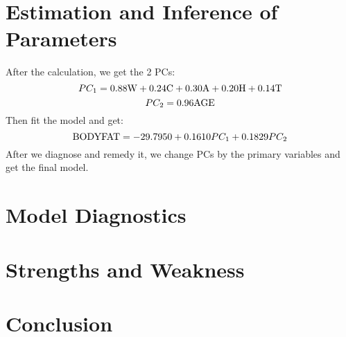 \documentclass[12pt]{article}
\begin{document}
\section{\sffamily Estimation and Inference of Parameters}
After the calculation, we get the 2 PCs:
$$PC_1 = 0.88{\rm W} + 0.24 {\rm C} + 0.30
 {\rm A} + 0.20 {\rm H} + 0.14 {\rm T}$$
$$PC_2 = 0.96{\rm AGE} $$
Then fit the model and get:
$${\rm BODYFAT} = -29.7950 + 0.1610 PC_1 + 0.1829PC_2$$
After we diagnose and remedy it, we change PCs by the primary variables and get the final model.
\section{\sffamily Model Diagnostics}

\section{\sffamily Strengths and Weakness}

\section{\sffamily Conclusion}
\end{document}
